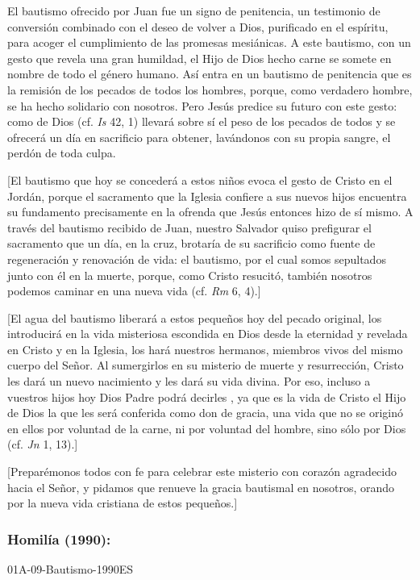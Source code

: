 \begin{body}
	El bautismo ofrecido por Juan fue un signo de penitencia, un testimonio de conversión combinado con el deseo de volver a Dios, purificado en el espíritu, para acoger el cumplimiento de las promesas mesiánicas. A este bautismo, con un gesto que revela una gran humildad, el Hijo de Dios hecho carne se somete en nombre de todo el género humano. Así entra en un bautismo de penitencia que es la remisión de los pecados de todos los hombres, porque, como verdadero hombre, se ha hecho solidario con nosotros. Pero Jesús predice su futuro con este gesto: como  de Dios (cf. \emph{Is} 42, 1) llevará sobre sí el peso de los pecados de todos y se ofrecerá un día en sacrificio para obtener, lavándonos con su propia sangre, el perdón de toda culpa.

	{[}El bautismo que hoy se concederá a estos niños evoca el gesto de Cristo en el Jordán, porque el sacramento que la Iglesia confiere a sus nuevos hijos encuentra su fundamento precisamente en la ofrenda que Jesús entonces hizo de sí mismo. A través del bautismo recibido de Juan, nuestro Salvador quiso prefigurar el sacramento que un día, en la cruz, brotaría de su sacrificio como fuente de regeneración y renovación de vida: el bautismo, por el cual somos sepultados junto con él en la muerte, porque, como Cristo resucitó, también nosotros podemos caminar en una nueva vida (cf. \emph{Rm} 6, 4).{]}

	{[}El agua del bautismo liberará a estos pequeños hoy del pecado original, los introducirá en la vida misteriosa escondida en Dios desde la eternidad y revelada en Cristo y en la Iglesia, los hará nuestros hermanos, miembros vivos del mismo cuerpo del Señor. Al sumergirlos en su misterio de muerte y resurrección, Cristo les dará un nuevo nacimiento y les dará su vida divina. Por eso, incluso a vuestros hijos hoy Dios Padre podrá decirles , ya que es la vida de Cristo el Hijo de Dios la que les será conferida como don de gracia, una vida que no se originó en ellos por voluntad de la carne, ni por voluntad del hombre, sino sólo por Dios (cf. \emph{Jn} 1, 13).{]}

	{[}Preparémonos todos con fe para celebrar este misterio con corazón agradecido hacia el Señor, y pidamos que renueve la gracia bautismal en nosotros, orando por la nueva vida cristiana de estos pequeños.{]}

	\subsubsection{Homilía (1990):} 01A-09-Bautismo-1990ES


\end{body}

